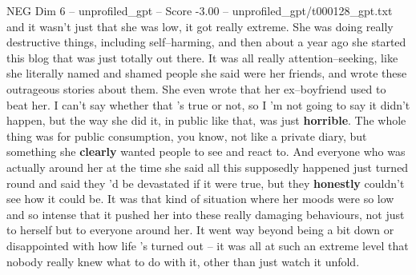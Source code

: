 \begin{textsample}{NEG Dim 6 – unprofiled\_gpt – Score -3.00 – unprofiled\_gpt/t000128\_gpt.txt}  \label{ex:f6_neg_024}
and it wasn't just that she was low, it got really extreme.
She was doing really destructive things, including self–harming, and then about a year ago she started this blog that was just totally out there.
It was all really attention–seeking, like she literally named and shamed people she said were her friends, and wrote these outrageous stories about them.
She even wrote that her ex–boyfriend used to beat her.
I can't say whether that ’s true or not, so I ’m not going to say it didn't happen, but the way she did it, in public like that, was just \textbf{horrible}.
The whole thing was for public consumption, you know, not like a private diary, but something she \textbf{clearly} wanted people to see and react to.
And everyone who was actually around her at the time she said all this supposedly happened just turned round and said they ’d be devastated if it were true, but they \textbf{honestly} couldn't see how it could be.
It was that kind of situation where her moods were so low and so intense that it pushed her into these really damaging behaviours, not just to herself but to everyone around her.
It went way beyond being a bit down or disappointed with how life ’s turned out – it was all at such an extreme level that nobody really knew what to do with it, other than just watch it unfold.

\end{textsample}
